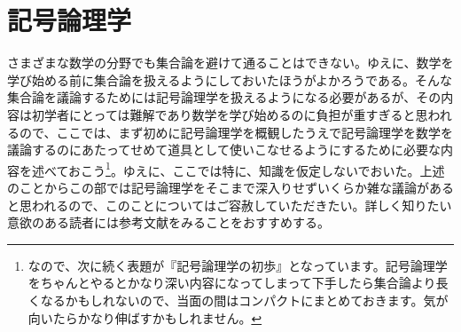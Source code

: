 \documentclass[a4paper]{jsarticle}
\begin{document}
\section{記号論理学}
さまざまな数学の分野でも集合論を避けて通ることはできない。ゆえに、数学を学び始める前に集合論を扱えるようにしておいたほうがよかろうである。そんな集合論を議論するためには記号論理学を扱えるようになる必要があるが、その内容は初学者にとっては難解であり数学を学び始めるのに負担が重すぎると思われるので、ここでは、まず初めに記号論理学を概観したうえで記号論理学を数学を議論するのにあたってせめて道具として使いこなせるようにするために必要な内容を述べておこう\footnote{なので、次に続く表題が『記号論理学の初歩』となっています。記号論理学をちゃんとやるとかなり深い内容になってしまって下手したら集合論より長くなるかもしれないので、当面の間はコンパクトにまとめておきます。気が向いたらかなり伸ばすかもしれません。}。ゆえに、ここでは特に、知識を仮定しないでおいた。上述のことからこの部では記号論理学をそこまで深入りせずいくらか雑な議論があると思われるので、このことについてはご容赦していただきたい。詳しく知りたい意欲のある読者には参考文献をみることをおすすめする。
\end{document}
